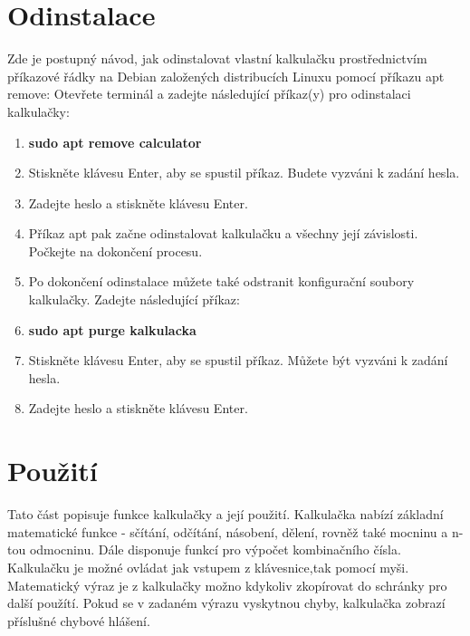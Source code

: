 \documentclass[a4paper, 11pt]{article}
\begin{document}
	\section{Odinstalace}
    Zde je postupný návod, jak odinstalovat vlastní kalkulačku prostřednictvím příkazové řádky na Debian založených distribucích Linuxu pomocí příkazu apt remove:
    Otevřete terminál a zadejte následující příkaz(y) pro odinstalaci kalkulačky:
    \begin{enumerate}
        \item \textbf{sudo apt remove calculator}
        \item Stiskněte klávesu Enter, aby se spustil příkaz. Budete vyzváni k zadání hesla.
        \item Zadejte heslo a stiskněte klávesu Enter.
        \item Příkaz apt pak začne odinstalovat kalkulačku a všechny její závislosti. Počkejte na dokončení procesu.
        \item Po dokončení odinstalace můžete také odstranit konfigurační soubory kalkulačky. Zadejte následující příkaz:
        \item \textbf{sudo apt purge kalkulacka}
        \item Stiskněte klávesu Enter, aby se spustil příkaz. Můžete být vyzváni k zadání hesla.
        \item Zadejte heslo a stiskněte klávesu Enter.
    \end{enumerate}
    \pagebreak
	\section{Použití}
        Tato část popisuje funkce kalkulačky a její použití. Kalkulačka nabízí základní matematické funkce - sčítání, odčítání, násobení, dělení, rovněž také mocninu a n-tou odmocninu. Dále disponuje funkcí pro výpočet kombinačního čísla. Kalkulačku je možné ovládat jak vstupem z klávesnice,tak pomocí myši. Matematický výraz je z kalkulačky možno kdykoliv zkopírovat do schránky pro další použítí. Pokud se v zadaném výrazu vyskytnou chyby, kalkulačka zobrazí příslušné chybové hlášení. 
\end{document}
